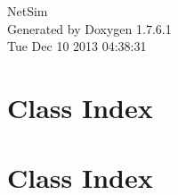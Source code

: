 \documentclass[a4paper]{book}
\begin{document}
\hypersetup{pageanchor=false,citecolor=blue}
\begin{titlepage}
\vspace*{7cm}
\begin{center}
{\Large \-Net\-Sim }\\
\vspace*{1cm}
{\large \-Generated by Doxygen 1.7.6.1}\\
\vspace*{0.5cm}
{\small Tue Dec 10 2013 04:38:31}\\
\end{center}
\end{titlepage}
\clearemptydoublepage
{}
\tableofcontents
\clearemptydoublepage
{}
\hypersetup{pageanchor=true,citecolor=blue}
\chapter{\-Class \-Index}

\chapter{\-Class \-Index}

\end{document}
